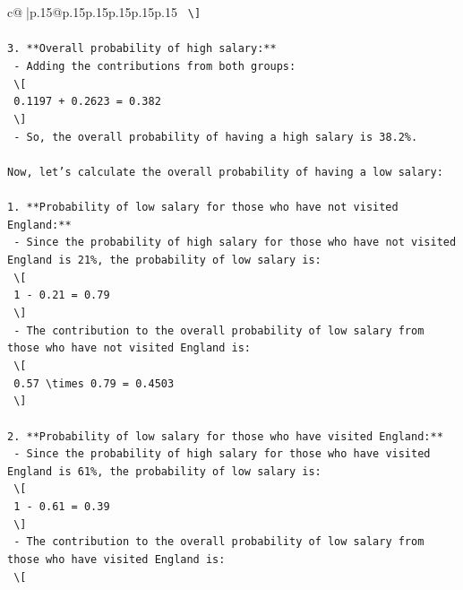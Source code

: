 \documentclass{article}
\begin{document}
{\begin{supertabular}{c@{$\;$}|p{.15\linewidth}@{}p{.15\linewidth}p{.15\linewidth}p{.15\linewidth}p{.15\linewidth}p{.15\linewidth}}
{{{\texttt{     \textbackslash{}{]}} \\
\\ 
\texttt{3. **Overall probability of high salary:**} \\
\texttt{   {-} Adding the contributions from both groups:} \\
\texttt{     \textbackslash{}{[}} \\
\texttt{     0.1197 + 0.2623 = 0.382} \\
\texttt{     \textbackslash{}{]}} \\
\texttt{   {-} So, the overall probability of having a high salary is 38.2\%.} \\
\\ 
\texttt{Now, let's calculate the overall probability of having a low salary:} \\
\\ 
\texttt{1. **Probability of low salary for those who have not visited England:**} \\
\texttt{   {-} Since the probability of high salary for those who have not visited England is 21\%, the probability of low salary is:} \\
\texttt{     \textbackslash{}{[}} \\
\texttt{     1 {-} 0.21 = 0.79} \\
\texttt{     \textbackslash{}{]}} \\
\texttt{   {-} The contribution to the overall probability of low salary from those who have not visited England is:} \\
\texttt{     \textbackslash{}{[}} \\
\texttt{     0.57 \textbackslash{}times 0.79 = 0.4503} \\
\texttt{     \textbackslash{}{]}} \\
\\ 
\texttt{2. **Probability of low salary for those who have visited England:**} \\
\texttt{   {-} Since the probability of high salary for those who have visited England is 61\%, the probability of low salary is:} \\
\texttt{     \textbackslash{}{[}} \\
\texttt{     1 {-} 0.61 = 0.39} \\
\texttt{     \textbackslash{}{]}} \\
\texttt{   {-} The contribution to the overall probability of low salary from those who have visited England is:} \\
\texttt{     \textbackslash{}{[}} \\
}}}
\end{supertabular}}
\end{document}

